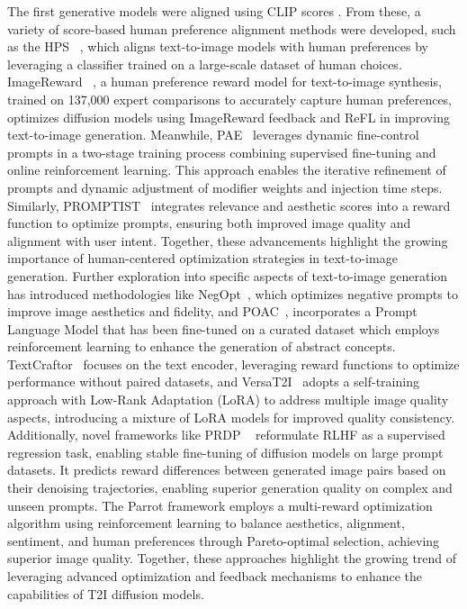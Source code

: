 The first generative models were aligned using CLIP scores \citep{radford2021learningtransferablevisualmodels}. From these, a variety of score-based human preference alignment methods were developed, such as the HPS ~\citep{wu2023human}, which aligns text-to-image models with human preferences by leveraging a classifier trained on a large-scale dataset of human choices. ImageReward ~\citep{xu2024imagereward}, a human preference reward model for text-to-image synthesis, trained on 137,000 expert comparisons to accurately capture human preferences, optimizes diffusion models using ImageReward feedback and ReFL in improving text-to-image generation.  Meanwhile, PAE~\citep{mo2024dynamic} leverages dynamic fine-control prompts in a two-stage training process combining supervised fine-tuning and online reinforcement learning. This approach enables the iterative refinement of prompts and dynamic adjustment of modifier weights and injection time steps. Similarly, PROMPTIST~\citep{hao2024optimizing} integrates relevance and aesthetic scores into a reward function to optimize prompts, ensuring both improved image quality and alignment with user intent. Together, these advancements highlight the growing importance of human-centered optimization strategies in text-to-image generation. Further exploration into specific aspects of text-to-image generation has introduced methodologies like NegOpt~\citep{ogezi2024optimizing}, which optimizes negative prompts to improve image aesthetics and fidelity, and POAC~\citep{fan2024prompt}, incorporates a Prompt Language Model that has been fine-tuned on a curated dataset which employs reinforcement learning to enhance the generation of abstract concepts. 
TextCraftor~\citep{li2024textcraftor} focuses on the text encoder, leveraging reward functions to optimize performance without paired datasets, and VersaT2I~\citep{guo2024versat2i} adopts a self-training approach with Low-Rank Adaptation (LoRA) to address multiple image quality aspects, introducing a mixture of LoRA models for improved quality consistency. Additionally, novel frameworks like PRDP ~\citep{deng2024prdp} reformulate RLHF as a supervised regression task, enabling stable fine-tuning of diffusion models on large prompt datasets. It predicts reward differences between generated image pairs based on their denoising trajectories, enabling superior generation quality on complex and unseen prompts. 
The Parrot framework \citep{lee2025parrot} employs a multi-reward optimization algorithm using reinforcement learning to balance aesthetics, alignment, sentiment, and human preferences through Pareto-optimal selection, achieving superior image quality.  Together, these approaches highlight the growing trend of leveraging advanced optimization and feedback mechanisms to enhance the capabilities of T2I diffusion models.

